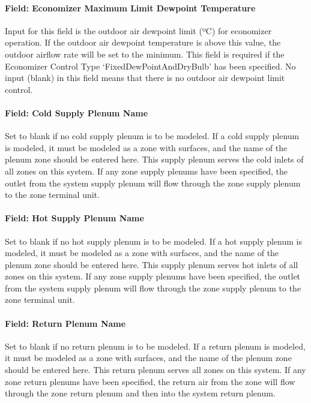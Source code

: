 \paragraph{Field: Economizer Maximum Limit Dewpoint Temperature}\label{field-economizer-maximum-limit-dewpoint-temperature-6}

Input for this field is the outdoor air dewpoint limit (ºC) for economizer operation. If the outdoor air dewpoint temperature is above this value, the outdoor airflow rate will be set to the minimum. This field is required if the Economizer Control Type `FixedDewPointAndDryBulb' has been specified. No input (blank) in this field means that there is no outdoor air dewpoint limit control.

\paragraph{Field: Cold Supply Plenum Name}\label{field-cold-supply-plenum-name-1}

Set to blank if no cold supply plenum is to be modeled. If a cold supply plenum is modeled, it must be modeled as a zone with surfaces, and the name of the plenum zone should be entered here. This supply plenum serves the cold inlets of all zones on this system. If any zone supply plenums have been specified, the outlet from the system supply plenum will flow through the zone supply plenum to the zone terminal unit.

\paragraph{Field: Hot Supply Plenum Name}\label{field-hot-supply-plenum-name-1}

Set to blank if no hot supply plenum is to be modeled. If a hot supply plenum is modeled, it must be modeled as a zone with surfaces, and the name of the plenum zone should be entered here. This supply plenum serves hot inlets of all zones on this system. If any zone supply plenums have been specified, the outlet from the system supply plenum will flow through the zone supply plenum to the zone terminal unit.

\paragraph{Field: Return Plenum Name}\label{field-return-plenum-name-12}

Set to blank if no return plenum is to be modeled. If a return plenum is modeled, it must be modeled as a zone with surfaces, and the name of the plenum zone should be entered here. This return plenum serves all zones on this system. If any zone return plenums have been specified, the return air from the zone will flow through the zone return plenum and then into the system return plenum.

